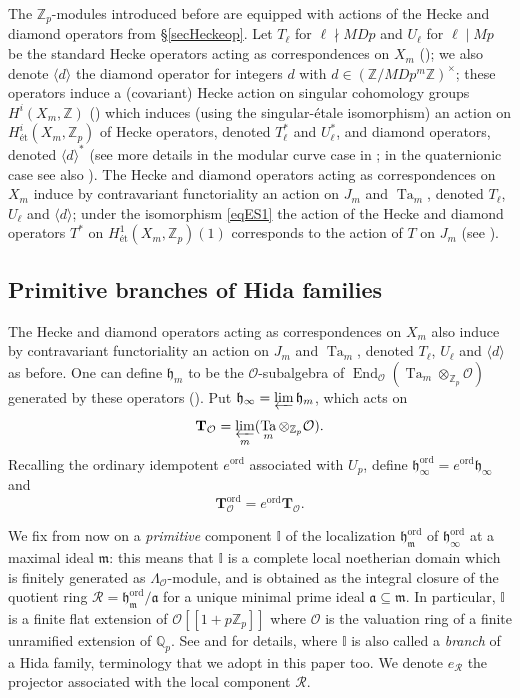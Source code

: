 \documentclass[a4paper,11pt]{amsart}
\numberwithin{equation}{section}
\theoremstyle{plain}
\theoremstyle{definition}
\theoremstyle{remark}
\newcommand{\Q}{\mathbb{Q}}
\newcommand{\Z}{\mathbb{Z}}
\newcommand{\I}{\mathbb{I}}
\DeclareMathOperator{\End}{End}
\DeclareMathOperator{\Ta}{Ta}
\newcommand{\ord}{\mathrm{ord}}
\newcommand{\invlim}{\mathop{\varprojlim}\limits}
\begin{document}
The $\Z_p$-modules introduced before are equipped with actions of the Hecke and diamond operators from \S\ref{secHeckeop}. Let $T_\ell$ for $\ell\nmid MDp$ and $U_\ell$ for $\ell\mid Mp$ be the standard Hecke operators
acting as correspondences on $X_m$ (\cite[\S3.1, \S7.2]{shimura}); we also denote $\langle d\rangle$ the diamond operator for integers $d$ with $d\in (\Z/MDp^m\Z)^\times$; these operators induce a (covariant) Hecke action on singular 
cohomology groups $H^i(X_m,\Z)$ (\cite[\S8.2]{shimura}) which induces (using the singular-\'etale isomorphism) an action on 
$H^i_\text{\'et}(X_m,\Z_p)$ of Hecke operators, denoted $T_\ell^*$ and $U_\ell^*$, and diamond operators, denoted $\langle d\rangle^*$ (see more details in the modular curve case in 
\cite[\S7.3]{OhtaJ}; in the quaternionic case see also \cite[\S2.1]{LV-IJNT}). 
The Hecke and diamond operators acting as correspondences on $X_m$ induce by contravariant functoriality an action 
on $J_m$ and $\Ta_m$, denoted $T_\ell$, $U_\ell$ and $\langle d\rangle$; under the isomorphism \eqref{eqES1} 
the action of the Hecke and diamond operators $T^*$ on $H^1_\text{\'et}(X_m,\Z_p)(1)$ corresponds to the action of $T$ on $J_m$ (see \cite[\S8]{hida-galois}).

\subsection{Primitive branches of Hida families}\label{PBHF}
The Hecke and diamond operators acting as correspondences on $X_m$ also induce by contravariant functoriality an action 
on $J_m$ and $\Ta_m$, denoted $T_\ell$, $U_\ell$ and $\langle d\rangle$ as before. 
 One can define $\mathfrak{h}_m$ to be the $\mathcal{O}$-subalgebra of 
$\End_\mathcal{O}(\Ta_m\otimes_{\Z_p}\mathcal{O})$ generated by these operators (\cite[Section 6]{LV-MM}).
Put $\mathfrak{h}_\infty=\invlim\mathfrak{h}_m$, which acts on \[\mathbf{T}_\mathcal{O}=\invlim_m (\Ta_m\otimes_{\Z_p}\mathcal{O}).\] Recalling the ordinary idempotent $e^\ord$ associated with $U_p$, define $\mathfrak{h}_\infty^\ord=e^\ord\mathfrak{h}_\infty$ 
and \[\mathbf{T}^\ord_\mathcal{O}=e^\ord\mathbf{T}_\mathcal{O}.\]

We fix from now on a \emph{primitive} component $\I$ of the localization $\mathfrak{h}_\mathfrak{m}^\ord$  of 
$\mathfrak{h}_\infty^\ord$ at a maximal ideal $\mathfrak{m}$: this means that    
$\mathbb{I}$ is a complete local noetherian domain which is finitely generated as $\Lambda_\mathcal{O}$-module, 
and is obtained as the integral closure of the quotient ring $\mathcal{R}=\mathfrak{h}_\mathfrak{m}^\ord/\mathfrak{a}$ 
for a unique minimal prime ideal $\mathfrak{a}\subseteq\mathfrak{m}$. In particular, $\mathbb{I}$ is a finite flat extension of $\mathcal{O}[[1+p\Z_p]]$ where $\mathcal{O}$ is the valuation ring of a finite unramified extension of $\Q_p$.
See \cite[\S1.5]{NP} and \cite[Sections 5-6]{LV-MM} for details, where $\I$ is also called a \emph{branch} 
of a Hida family, terminology  that we adopt in this paper too. 
We denote $e_\mathcal{R}$ the projector associated with the local component $\mathcal{R}$. 
\end{document}
